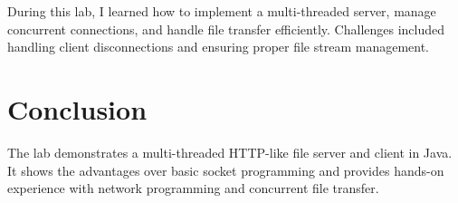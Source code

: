 \documentclass{article}
\begin{document}
During this lab, I learned how to implement a multi-threaded server, manage concurrent connections, and handle file transfer efficiently. Challenges included handling client disconnections and ensuring proper file stream management.

\section{Conclusion}
The lab demonstrates a multi-threaded HTTP-like file server and client in Java. It shows the advantages over basic socket programming and provides hands-on experience with network programming and concurrent file transfer.
\end{document}
